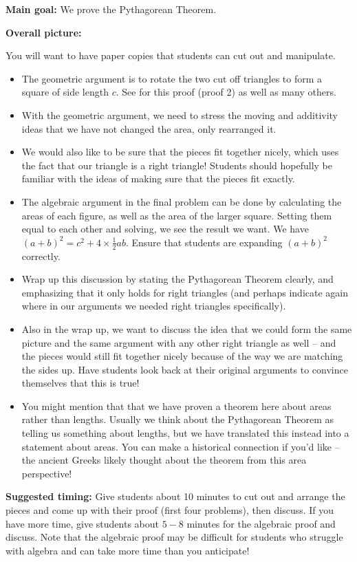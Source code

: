 \documentclass[nooutcomes,noauthor]{ximera}
\begin{document}
\begin{instructorNotes} 



{\bf Main goal:} We prove the Pythagorean Theorem.

{\bf Overall picture:}


You will want to have paper copies that students can cut out and manipulate.
\begin{itemize}
	\item The geometric argument is to rotate the two cut off triangles to form a square of side length $c$. See  for this proof (proof 2) as well as many others.
	\item With the geometric argument, we need to stress the moving and additivity ideas that we have not changed the area, only rearranged it.
	\item We would also like to be sure that the pieces fit together nicely, which uses the fact that our triangle is a right triangle! Students should hopefully be familiar with the ideas of making sure that the pieces fit exactly.
	\item The algebraic argument in the final problem can be done by calculating the areas of each figure, as well as the area of the larger square. Setting them equal to each other and solving, we see the result we want. We have $(a+b)^2 = c^2 + 4 \times \frac{1}{2}ab$. Ensure that students are expanding $(a+b)^2$ correctly.
	\item Wrap up this discussion by stating the Pythagorean Theorem clearly, and emphasizing that it only holds for right triangles (and perhaps indicate again where in our arguments we needed right triangles specifically).
	\item Also in the wrap up, we want to discuss the idea that we could form the same picture and the same argument with any other right triangle as well -- and the pieces would still fit together nicely because of the way we are matching the sides up. Have students look back at their original arguments to convince themselves that this is true!
	\item You might mention that that we have proven a theorem here about areas rather than lengths. Usually we think about the Pythagorean Theorem as telling us something about lengths, but we have translated this instead into a statement about areas. You can make a historical connection if you'd like -- the ancient Greeks likely thought about the theorem from this area perspective!
\end{itemize}






{\bf Suggested timing:} Give students about 10 minutes to cut out and arrange the pieces and come up with their proof (first four problems), then discuss. If you have more time, give students about $5-8$ minutes for the algebraic proof and discuss. Note that the algebraic proof may be difficult for students who struggle with algebra and can take more time than you anticipate!



\end{instructorNotes}
\end{document}
